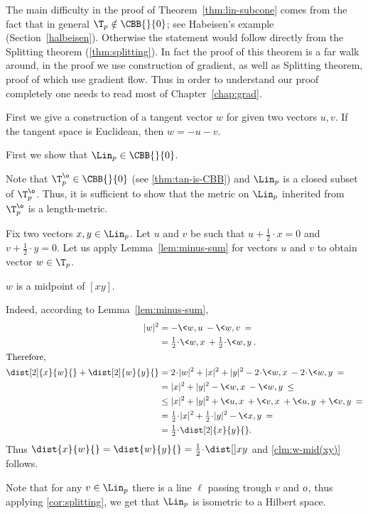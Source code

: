 The main difficulty in the proof of Theorem~\ref{thm:lin-subcone} comes from the fact that in general $\T_p\notin\CBB{}{0}$;
see Habeisen's example (Section~\ref{halbeisen}).
Otherwise the statement would follow directly from the Splitting theorem (\ref{thm:splitting}).
In fact the proof of this theorem is a far walk around, in the proof we use construction of gradient, as well as Splitting theorem, proof of which use gradient flow.
Thus in order to understand our proof completely one needs to read most of Chapter~\ref{chap:grad}.

First we give a construction of a tangent vector $w$ for given two vectors $u,v$.
If the tangent space is Euclidean, then  $w=-u-v$.




First we show that $\Lin_p\in \CBB{}{0}$.

Note that $\T^\o_p\in \CBB{}{0}$ (see \ref{thm:tan-is-CBB}) and $\Lin_p$ is a closed subset of $\T^\o_p$.
Thus, it is sufficient to show that the metric on $\Lin_p$ inherited from $\T^\o_p$ is a length-metric.

Fix two vectors $x,y\in\Lin_p$.
Let $u$ and $v$ be such that $u+\tfrac{1}{2}\cdot x=0$ 
and $v+\tfrac{1}{2}\cdot y=0$.
Let us apply Lemma~\ref{lem:minus-sum} 
for vectors $u$ and $v$ to obtain vector $w\in \T_p$.
\begin{clm}{}\label{clm:w-mid(xy)}
$w$ is a midpoint of $[x y]$.
\end{clm}

Indeed, according to Lemma~\ref{lem:minus-sum}, 
\begin{align*}
|w|^2
&=
-\<w,u\>-\<w,v\>
=
\\
&=
\tfrac{1}{2}\cdot\<w,x\>+\tfrac{1}{2}\cdot\<w,y\>.
\\
\intertext{Therefore,}
\dist[2]{x}{w}{}+\dist[2]{w}{y}{}
&=2\cdot|w|^2+|x|^2+|y|^2-2\cdot\<w,x\>-2\cdot\<w,y\>=\\
&=|x|^2+|y|^2-\<w,x\>-\<w,y\>\le\\
&\le |x|^2+|y|^2+\<u,x\>+\<v,x\>+\<u,y\>+\<v,y\>=\\
&=\tfrac{1}{2}\cdot|x|^2+\tfrac{1}{2}\cdot|y|^2-\<x,y\>=\\
&=\tfrac{1}{2}\cdot\dist[2]{x}{y}{}.
\end{align*}
Thus $\dist{x}{w}{}=\dist{w}{y}{}=\tfrac{1}{2}\cdot\dist[{{}}]{x}{y}{}$ and \ref{clm:w-mid(xy)} follows.
\claimqeds

Note that for any $v\in\Lin_p$ there is a line $\ell$ passing trough $v$ and $o$, thus applying \ref{cor:splitting}, we get that $\Lin_p$ is isometric to a Hilbert space.
\qeds


